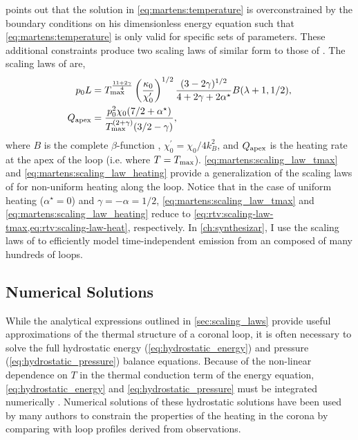 \citet{martens_scaling_2010} points out that the solution in \autoref{eq:martens:temperature} is overconstrained by the boundary conditions on his dimensionless energy equation such that \autoref{eq:martens:temperature} is only valid for specific sets of parameters. These additional constraints produce two scaling laws of similar form to those of \citet{rosner_dynamics_1978,serio_dynamics_1991}. The scaling laws of \citet{martens_scaling_2010} are,
\begin{align}
    p_0L &= T_\textup{max}^{\frac{11+2\gamma}{4}} \left(\frac{\kappa_0}{\chi_0^\prime}\right)^{1/2}\frac{(3-2\gamma)^{1/2}}{4 + 2\gamma + 2\alpha^\star} B(\lambda + 1, 1/2), \label{eq:martens:scaling_law_tmax} \\
    Q_\textup{apex} &= \frac{p_0^2\chi_0(7/2 + \alpha^\star)}{T_\textup{max}^{(2+\gamma)}(3/2 - \gamma)}, \label{eq:martens:scaling_law_heating}
\end{align}
where $B$ is the complete $\beta$-function \citep[see Equation 6.2.1 of][]{abramowitz_handbook_1972}, $\chi_0^\prime=\chi_0/4k_B^2$, and $Q_\textup{apex}$ is the heating rate at the apex of the loop (i.e. where $T=T_\textup{max}$). \autoref{eq:martens:scaling_law_tmax} and \autoref{eq:martens:scaling_law_heating} provide a generalization of the scaling laws of \citet{rosner_dynamics_1978} for non-uniform heating along the loop. Notice that in the case of uniform heating ($\alpha^\star=0$) and $\gamma=-\alpha=1/2$, \autoref{eq:martens:scaling_law_tmax} and \autoref{eq:martens:scaling_law_heating} reduce to \cref{eq:rtv:scaling-law-tmax,eq:rtv:scaling-law-heat}, respectively. In \autoref{ch:synthesizar}, I use the scaling laws of \citet{martens_scaling_2010} to efficiently model time-independent emission from an \AR{} composed of many hundreds of loops.  

\subsection{Numerical Solutions}\label{sec:hydrostatic_numerical}

While the analytical expressions outlined in \autoref{sec:scaling_laws} provide useful approximations of the thermal structure of a coronal loop, it is often necessary to solve the full hydrostatic energy (\autoref{eq:hydrostatic_energy}) and pressure (\autoref{eq:hydrostatic_pressure}) balance equations. Because of the non-linear dependence on $T$ in the thermal conduction term of the energy equation, \autoref{eq:hydrostatic_energy} and \autoref{eq:hydrostatic_pressure} must be integrated numerically \citep[e.g. with an Euler or Runge-Kutta scheme, see][Chapter 16]{press_numerical_1992}. Numerical solutions of these hydrostatic solutions have been used by many authors \citep[e.g.][]{aschwanden_modeling_2001} to constrain the properties of the heating in the corona by comparing with loop profiles derived from observations.

